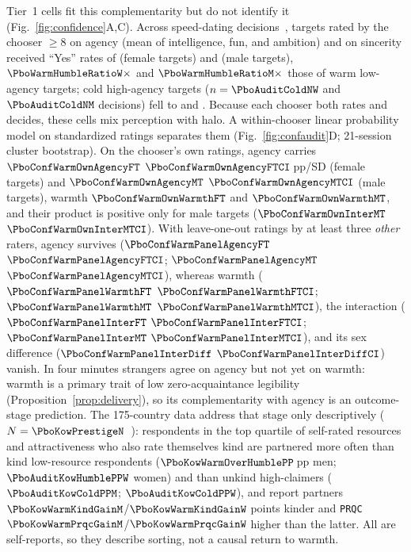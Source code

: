 Tier~1 cells fit this complementarity but do not identify it (Fig.~\ref{fig:confidence}A,C). Across \SdRows{} speed-dating decisions~\cite{fisman2006}, targets rated by the chooser $\ge 8$ on agency (mean of intelligence, fun, and ambition) and on sincerity received ``Yes'' rates of \PboWarmOutlierYesW{} (female targets) and \PboWarmOutlierYesM{} (male targets), $\PboWarmHumbleRatioW\times$ and $\PboWarmHumbleRatioM\times$ those of warm low-agency targets; cold high-agency targets ($n=\PboAuditColdNW$ and $\PboAuditColdNM$ decisions) fell to \PboColdArrogantYesW{} and \PboColdArrogantYesM{}. Because each chooser both rates and decides, these cells mix perception with halo. A within-chooser linear probability model on standardized ratings separates them (Fig.~\ref{fig:confaudit}D; 21-session cluster bootstrap). On the chooser's own ratings, agency carries $\PboConfWarmOwnAgencyFT$ $\PboConfWarmOwnAgencyFTCI$\,pp/SD (female targets) and $\PboConfWarmOwnAgencyMT$ $\PboConfWarmOwnAgencyMTCI$ (male targets), warmth $\PboConfWarmOwnWarmthFT$ and $\PboConfWarmOwnWarmthMT$, and their product is positive only for male targets ($\PboConfWarmOwnInterMT$ $\PboConfWarmOwnInterMTCI$). With leave-one-out ratings by at least three \emph{other} raters, agency survives ($\PboConfWarmPanelAgencyFT$ $\PboConfWarmPanelAgencyFTCI$; $\PboConfWarmPanelAgencyMT$ $\PboConfWarmPanelAgencyMTCI$), whereas warmth ($\PboConfWarmPanelWarmthFT$ $\PboConfWarmPanelWarmthFTCI$; $\PboConfWarmPanelWarmthMT$ $\PboConfWarmPanelWarmthMTCI$), the interaction ($\PboConfWarmPanelInterFT$ $\PboConfWarmPanelInterFTCI$; $\PboConfWarmPanelInterMT$ $\PboConfWarmPanelInterMTCI$), and its sex difference ($\PboConfWarmPanelInterDiff$ $\PboConfWarmPanelInterDiffCI$) vanish. In four minutes strangers agree on agency but not yet on warmth: warmth is a primary trait of low zero-acquaintance legibility (Proposition~\ref{prop:delivery}), so its complementarity with agency is an outcome-stage prediction. The 175-country data address that stage only descriptively ($N=\PboKowPrestigeN$~\cite{kowal2025}): respondents in the top quartile of self-rated resources and attractiveness who also rate themselves kind are partnered more often than kind low-resource respondents ($\PboKowWarmOverHumblePP$\,pp men; $\PboAuditKowHumblePPW$ women) and than unkind high-claimers ($\PboAuditKowColdPPM$; $\PboAuditKowColdPPW$), and report partners $\PboKowWarmKindGainM$/$\PboKowWarmKindGainW$ points kinder and \texttt{PRQC} $\PboKowWarmPrqcGainM$/$\PboKowWarmPrqcGainW$ higher than the latter. All are self-reports, so they describe sorting, not a causal return to warmth.

